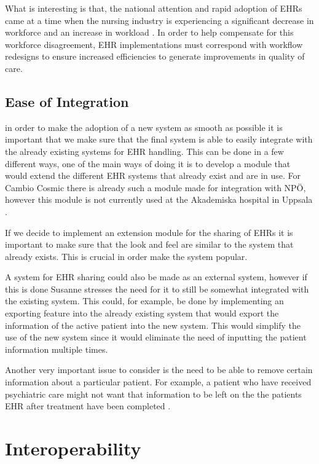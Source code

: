 \documentclass[14pt]{article}
\begin{document}
What is interesting is that, the national attention and rapid adoption of \gls{EHR}s came at a time when the nursing industry is experiencing a significant decrease in workforce and an increase in workload \cite{MITRE}. In order to help compensate for this workforce disagreement, \gls{EHR} implementations must correspond with workflow redesigns to ensure increased efficiencies to generate improvements in quality of care. 

\subsection{Ease of Integration}
in order to make the adoption of a new system as smooth as possible it is important that we make sure that the final system is able to easily integrate with the already existing systems for \gls{EHR} handling. This can be done in a few different ways, one of the main ways of doing it is to develop a module that would extend the different \gls{EHR} systems that already exist and are in use.\cite{EPJ2} For Cambio Cosmic there is already such a module made for integration with NPÖ, however this module is not currently used at the Akademiska hospital in Uppsala \cite{EPJ1}.

If we decide to implement an extension module for the sharing of \glspl{EHR} it is important to make sure that the look and feel are similar to the system that already exists. This is crucial in order make the system popular. 

A system for \gls{EHR} sharing could also be made as an external system, however if this is done Susanne stresses the need for it to still be somewhat integrated with the existing system. This could, for example, be done by implementing an exporting feature into the already existing system that would export the information of the active patient into the new system. This would simplify the use of the new system since it would eliminate the need of inputting the patient information multiple times.

Another very important issue to consider is the need to be able to remove certain information about a particular patient. For example, a patient who have received psychiatric care might not want that information to be left on the the patients \gls{EHR} after treatment have been completed \cite{EPJ1}.


\newpage

\section{Interoperability}
\label{sec:Interoperability}
\end{document}
